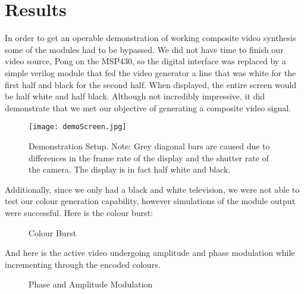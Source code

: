 \section{Results}

In order to get an operable demonstration of working composite video synthesis
some of the modules had to be bypassed. We did not have time to finish our video
source, Pong on the MSP430, so the digital interface was replaced by a simple
verilog module that fed the video generator a line that was white for the first
half and black for the second half. When displayed, the entire screen would be
half white and half black. Although not incredibly impressive, it did
demonstrate that we met our objective of generating a composite video signal.

\begin{figure} [H]
    \centering
    \texttt{[image: demoScreen.jpg]}
    \caption{Demonstration Setup. Note: Grey diagonal bars are caused due to
    differences in the frame rate of the display and the shutter rate of the
    camera. The display is in fact half white and black.}
\end{figure}

Additionally, since we only had a black and white television, we were not able
to test our colour generation capability, however simulations of the module
output were successful. Here is the colour burst:

\begin{figure}[H]
    \centering
    \caption{Colour Burst}
\end{figure}

And here is the active video undergoing amplitude and phase modulation while
incrementing through the encoded colours.

\begin{figure}[H]
    \centering
    \caption{Phase and Amplitude Modulation}
\end{figure}
